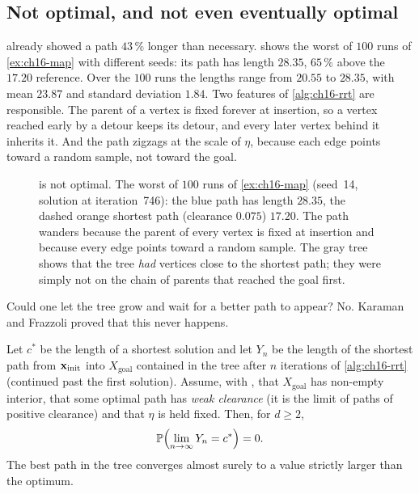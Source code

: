 \subsection{Not optimal, and not even eventually optimal}
\label{sec:ch16-suboptimal}

 already showed a path $43\,\%$ longer than
necessary.  shows the worst of $100$ runs of
\cref{ex:ch16-map} with different seeds: its path has length $28.35$,
$65\,\%$ above the $17.20$ reference. Over the $100$ runs the lengths range
from $20.55$ to $28.35$, with mean $23.87$ and standard deviation $1.84$.
Two features of \cref{alg:ch16-rrt}
are responsible. The parent of a vertex is fixed forever at insertion, so a
vertex reached early by a detour keeps its detour, and every later vertex
behind it inherits it. And the path zigzags at the scale of $\eta$, because
each edge points toward a random sample, not toward the goal.

\begin{figure}[tb]
  \centering
  \caption{\rrt is not optimal. The worst of $100$ runs of
  \cref{ex:ch16-map} (seed~14, solution at iteration~746): the blue \rrt path
  has length $28.35$, the dashed orange shortest path (clearance $0.075$)
  $17.20$. The path wanders because the parent of every vertex is fixed at
  insertion and because every edge points toward a random sample. The gray
  tree shows that the tree \emph{had} vertices close to the shortest path;
  they were simply not on the chain of parents that reached the goal first.}
  \label{fig:ch16-jagged}
\end{figure}

Could one let the tree grow and wait for a better path to appear? No.
Karaman and Frazzoli \cite{karaman2011sampling} proved that this never
happens.

\begin{theorem}
\label{thm:ch16-suboptimal}
Let $c^{*}$ be the length of a shortest solution and let $Y_n$ be the length
of the shortest path from $\mathbf{x}_{\mathrm{init}}$ into $X_{\mathrm{goal}}$
contained in the tree after $n$ iterations of \cref{alg:ch16-rrt}
(continued past the first solution). Assume, with
\textcite{karaman2011sampling}, that $X_{\mathrm{goal}}$ has non-empty
interior, that some optimal path has \emph{weak clearance} (it is the limit
of paths of positive clearance) and that $\eta$ is held fixed. Then, for
$d\ge2$,
\[
\mathbb{P}\Bigl(\lim_{n\to\infty}Y_n=c^{*}\Bigr)=0 .
\]
The best path in the tree converges almost surely to a value strictly larger
than the optimum.
\end{theorem}

